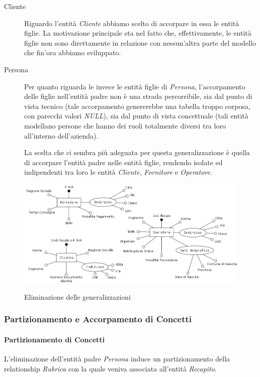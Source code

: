 			\begin{description}
				\item [Cliente] 
					Riguardo l'entità \emph{Cliente} abbiamo scelto di accorpare in essa le entità figlie. La motivazione principale sta nel fatto che, effettivamente, le entità figlie non sono direttamente in relazione con nessun'altra parte del modello che fin'ora abbiamo sviluppato.

				\item [Persona]
					Per quanto riguarda le invece le entità figlie di \emph{Persona}, l'accorpamento delle figlie nell'entità padre non è una strada percorribile, sia dal punto di vista tecnico (tale accorpamento genererebbe una tabella troppo corposa, con parecchi valori \emph{NULL}), sia dal punto di vista concettuale (tali entità modellano persone che hanno dei ruoli totalmente diversi tra loro all'interno dell'azienda).

					La scelta che ci sembra più adeguata per questa generalizzazione è quella di accorpare l'entità padre nelle entità figlie, rendendo isolate ed indipendenti tra loro le entità \emph{Cliente}, \emph{Fornitore} e \emph{Operatore}.
			\end{description}

			\begin{figure}[H]
				\includegraphics[width=13cm]{images/refactor/persona.png}
				\centering
				\label{fig:persona_refactor}
				\caption{Eliminazione delle generalizzazioni}
			\end{figure}
			
		\subsubsection{Partizionamento e Accorpamento di Concetti}

			\paragraph{Partizionamento di Concetti}
				L'eliminazione dell'entità padre \emph{Persona} induce un partizionamento della relationship \emph{Rubrica} con la quale veniva associata all'entità \emph{Recapito}.

